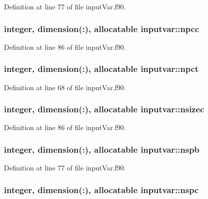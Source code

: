 Definition at line 77 of file input\-Var.\-f90.

\hypertarget{classinputvar_a78f4d80d45d564c96dd9101258656f66}{
\subsubsection[{npcc}]{\setlength{\rightskip}{0pt plus 5cm}integer, dimension(\-:), allocatable inputvar\-::npcc}}\label{classinputvar_a78f4d80d45d564c96dd9101258656f66}


Definition at line 86 of file input\-Var.\-f90.

\hypertarget{classinputvar_a0f5eeaa6713564c7a3aa547b8ce8bae9}{
\subsubsection[{npct}]{\setlength{\rightskip}{0pt plus 5cm}integer, dimension(\-:), allocatable inputvar\-::npct}}\label{classinputvar_a0f5eeaa6713564c7a3aa547b8ce8bae9}


Definition at line 68 of file input\-Var.\-f90.

\hypertarget{classinputvar_af28da5ec88564638bee476f2a37f5308}{
\subsubsection[{nsizec}]{\setlength{\rightskip}{0pt plus 5cm}integer, dimension(\-:), allocatable inputvar\-::nsizec}}\label{classinputvar_af28da5ec88564638bee476f2a37f5308}


Definition at line 86 of file input\-Var.\-f90.

\hypertarget{classinputvar_aa1e78ecd4b3cbb3f08b770cf604a5d3d}{
\subsubsection[{nspb}]{\setlength{\rightskip}{0pt plus 5cm}integer, dimension(\-:), allocatable inputvar\-::nspb}}\label{classinputvar_aa1e78ecd4b3cbb3f08b770cf604a5d3d}


Definition at line 77 of file input\-Var.\-f90.

\hypertarget{classinputvar_aad6ce13b0378ba79e193cb3738e2d938}{
\subsubsection[{nspc}]{\setlength{\rightskip}{0pt plus 5cm}integer, dimension(\-:), allocatable inputvar\-::nspc}}\label{classinputvar_aad6ce13b0378ba79e193cb3738e2d938}


